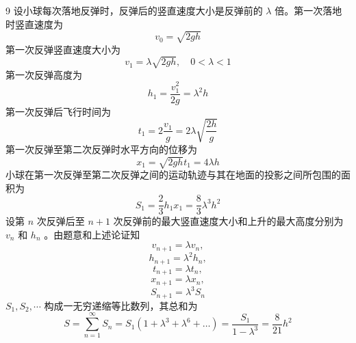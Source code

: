 \begin{solution}{9}
设小球每次落地反弹时，反弹后的竖直速度大小是反弹前的 $\lambda$ 倍。第一次落地时竖直速度为
\begin{equation}
v _ {0} = \sqrt {2 g h}
\label{eq:1.s9}
\end{equation}
第一次反弹竖直速度大小为
\begin{equation}
v _ {1} = \lambda \sqrt {2 g h}, \quad 0 < \lambda < 1
\label{eq:2.s9}
\end{equation}
第一次反弹高度为
\begin{equation}
h _ {1} = \frac {v _ {1} ^ {2}}{2 g} = \lambda^ {2} h
\label{eq:3.s9}
\end{equation}
第一次反弹后飞行时间为
\begin{equation}
t _ {1} = 2 \frac {v _ {1}}{g} = 2 \lambda \sqrt {\frac {2 h}{g}}
\label{eq:4.s9}
\end{equation}
第一次反弹至第二次反弹时水平方向的位移为
\begin{equation}
x _ {1} = \sqrt {2 g h} t _ {1} = 4 \lambda h
\label{eq:5.s9}
\end{equation}
小球在第一次反弹至第二次反弹之间的运动轨迹与其在地面的投影之间所包围的面积为
\begin{equation}
S _ {1} = \frac {2}{3} h _ {1} x _ {1} = \frac {8}{3} \lambda^ {3} h ^ {2}
\label{eq:6.s9}
\end{equation}
设第 $n$ 次反弹后至 $n + 1$ 次反弹前的最大竖直速度大小和上升的最大高度分别为 $v_{n}$ 和 $h_n$ 。由题意和上述论证知
\begin{equation}
v _ {n + 1} = \lambda v _ {n},
\label{eq:7.s9}
\end{equation}
\begin{equation}
h _ {n + 1} = \lambda^ {2} h _ {n},
\label{eq:8.s9}
\end{equation}
\begin{equation}
t _ {n + 1} = \lambda t _ {n},
\label{eq:9.s9}
\end{equation}
\begin{equation}
x _ {n + 1} = \lambda x _ {n},
\label{eq:10.s9}
\end{equation}
\begin{equation}
S _ {n + 1} = \lambda^ {3} S _ {n}
\label{eq:11.s9}
\end{equation}
$S_{1}, S_{2}, \cdots$ 构成一无穷递缩等比数列，其总和为
\begin{equation}
S = \sum_ {n = 1} ^ {\infty} S _ {n} = S _ {1} (1 + \lambda^ {3} + \lambda^ {6} + \dots) = \frac {S _ {1}}{1 - \lambda^ {3}} = \frac {8}{2 1} h ^ {2}

\end{equation}
\end{solution}
